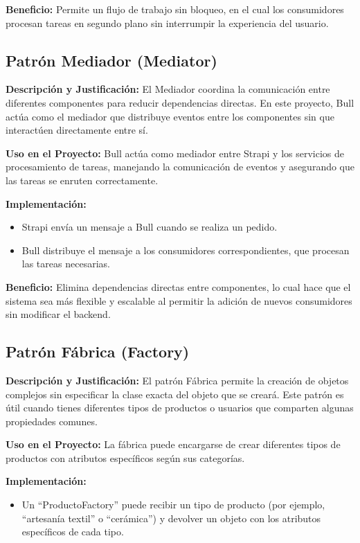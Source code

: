 \documentclass[12pt]{article}
\begin{document}
\textbf{Beneficio:} Permite un flujo de trabajo sin bloqueo, en el cual los consumidores procesan tareas en segundo plano sin interrumpir la experiencia del usuario.

\subsection{Patrón Mediador (Mediator)}
\textbf{Descripción y Justificación:} El Mediador coordina la comunicación entre diferentes componentes para reducir dependencias directas. En este proyecto, Bull actúa como el mediador que distribuye eventos entre los componentes sin que interactúen directamente entre sí.

\textbf{Uso en el Proyecto:} Bull actúa como mediador entre Strapi y los servicios de procesamiento de tareas, manejando la comunicación de eventos y asegurando que las tareas se enruten correctamente.

\textbf{Implementación:}
\begin{itemize}
    \item Strapi envía un mensaje a Bull cuando se realiza un pedido.
    \item Bull distribuye el mensaje a los consumidores correspondientes, que procesan las tareas necesarias.
\end{itemize}

\textbf{Beneficio:} Elimina dependencias directas entre componentes, lo cual hace que el sistema sea más flexible y escalable al permitir la adición de nuevos consumidores sin modificar el backend.

\subsection{Patrón Fábrica (Factory)}
\textbf{Descripción y Justificación:} El patrón Fábrica permite la creación de objetos complejos sin especificar la clase exacta del objeto que se creará. Este patrón es útil cuando tienes diferentes tipos de productos o usuarios que comparten algunas propiedades comunes.

\textbf{Uso en el Proyecto:} La fábrica puede encargarse de crear diferentes tipos de productos con atributos específicos según sus categorías.

\textbf{Implementación:}
\begin{itemize}
    \item Un “ProductoFactory” puede recibir un tipo de producto (por ejemplo, “artesanía textil” o “cerámica”) y devolver un objeto con los atributos específicos de cada tipo.
\end{itemize}
\end{document}
